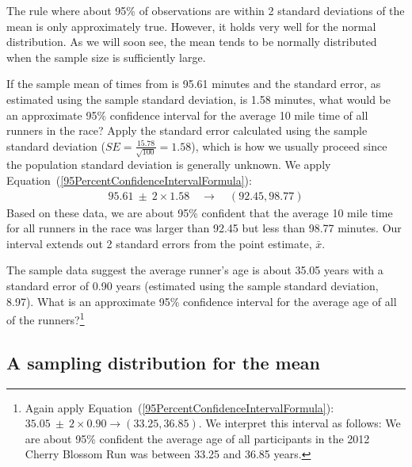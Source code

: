 The rule where about 95\% of observations are within 2 standard deviations of the mean is only approximately true. However, it holds very well for the normal distribution. As we will soon see, the mean tends to be normally distributed when the sample size is sufficiently large. 

\begin{example}{If the sample mean of times from  is 95.61 minutes and the standard error, as estimated using the sample standard deviation, is 1.58 minutes, what would be an approximate 95\% confidence interval for the average 10 mile time of all runners in the race? Apply the standard error calculated using the sample standard deviation ($SE=\frac{15.78}{\sqrt{100}} = 1.58$), which is how we usually proceed since the population standard deviation is generally unknown.}
We apply Equation~(\ref{95PercentConfidenceIntervalFormula}):
\begin{eqnarray*}
95.61\ \pm\ 2 \times  1.58 \quad \rightarrow \quad (92.45, 98.77)
\end{eqnarray*}
Based on these data, we are about 95\% confident that the average 10 mile time for all runners in the race was larger than 92.45 but less than 98.77 minutes. Our interval extends out 2 standard errors from the point estimate, $\bar{x}$.
\end{example}

\begin{exercise} \label{95CIExerciseForAgeOfYrbssSamp1}
The sample data suggest the average runner's age is about 35.05 years with a standard error of 0.90 years (estimated using the sample standard deviation, 8.97). What is an approximate 95\% confidence interval for the average age of all of the runners?\footnote{Again apply Equation~(\ref{95PercentConfidenceIntervalFormula}): $35.05 \ \pm \ 2\times 0.90 \rightarrow (33.25, 36.85)$. We interpret this interval as follows: We are about 95\% confident the average age of all participants in the 2012 Cherry Blossom Run was between 33.25 and 36.85 years.}
\end{exercise}

\subsection{A sampling distribution for the mean}

